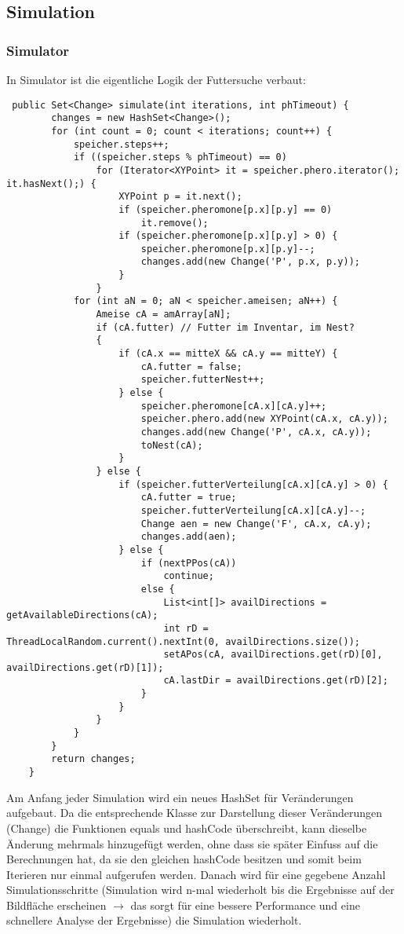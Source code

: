 \documentclass[a4paper,12pt]{scrartcl}
\begin{document}
\subsection*{Simulation}
\subsubsection*{Simulator}
In Simulator ist die eigentliche Logik der Futtersuche verbaut:
\begin{lstlisting}
 public Set<Change> simulate(int iterations, int phTimeout) {
		changes = new HashSet<Change>();
		for (int count = 0; count < iterations; count++) {
			speicher.steps++;
			if ((speicher.steps % phTimeout) == 0)
				for (Iterator<XYPoint> it = speicher.phero.iterator(); it.hasNext();) {
					XYPoint p = it.next();
					if (speicher.pheromone[p.x][p.y] == 0)
						it.remove();
					if (speicher.pheromone[p.x][p.y] > 0) {
						speicher.pheromone[p.x][p.y]--;
						changes.add(new Change('P', p.x, p.y));
					}
				}
			for (int aN = 0; aN < speicher.ameisen; aN++) {
				Ameise cA = amArray[aN];
				if (cA.futter) // Futter im Inventar, im Nest?
				{
					if (cA.x == mitteX && cA.y == mitteY) {
						cA.futter = false;
						speicher.futterNest++;
					} else {
						speicher.pheromone[cA.x][cA.y]++;
						speicher.phero.add(new XYPoint(cA.x, cA.y));
						changes.add(new Change('P', cA.x, cA.y));
						toNest(cA);
					}
				} else {
					if (speicher.futterVerteilung[cA.x][cA.y] > 0) {
						cA.futter = true;
						speicher.futterVerteilung[cA.x][cA.y]--;
						Change aen = new Change('F', cA.x, cA.y);
						changes.add(aen);
					} else {
						if (nextPPos(cA))
							continue;
						else {
							List<int[]> availDirections = getAvailableDirections(cA);
							int rD = ThreadLocalRandom.current().nextInt(0, availDirections.size());
							setAPos(cA, availDirections.get(rD)[0], availDirections.get(rD)[1]);
							cA.lastDir = availDirections.get(rD)[2];
						}
					}
				}
			}
		}
		return changes;
	}
\end{lstlisting}
Am Anfang jeder Simulation wird ein neues HashSet für Veränderungen aufgebaut. Da die entsprechende Klasse zur Darstellung dieser Veränderungen (Change) die Funktionen equals und hashCode überschreibt, kann dieselbe Änderung mehrmals hinzugefügt werden, ohne dass sie später Einfuss auf die Berechnungen hat, da sie den gleichen hashCode besitzen und somit beim Iterieren nur einmal aufgerufen werden. Danach wird für eine gegebene Anzahl Simulationsschritte (Simulation wird n-mal wiederholt bis die Ergebnisse auf der Bildfläche erscheinen $\rightarrow$ das sorgt für eine bessere Performance und eine schnellere Analyse der Ergebnisse) die Simulation wiederholt.
\end{document}
